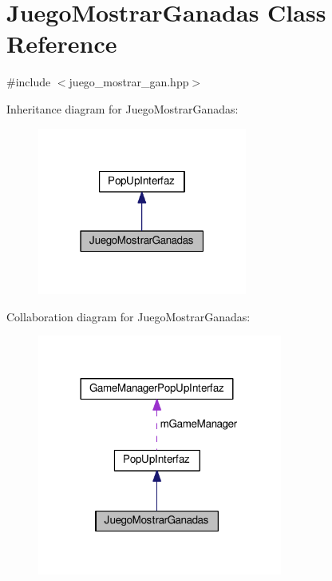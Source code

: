 \hypertarget{class_juego_mostrar_ganadas}{}\section{Juego\+Mostrar\+Ganadas Class Reference}
\label{class_juego_mostrar_ganadas}


{\ttfamily \#include $<$juego\+\_\+mostrar\+\_\+gan.\+hpp$>$}



Inheritance diagram for Juego\+Mostrar\+Ganadas\+:
\nopagebreak
\begin{figure}[H]
\begin{center}
\leavevmode
\includegraphics[width=195pt]{class_juego_mostrar_ganadas__inherit__graph}
\end{center}
\end{figure}


Collaboration diagram for Juego\+Mostrar\+Ganadas\+:
\nopagebreak
\begin{figure}[H]
\begin{center}
\leavevmode
\includegraphics[width=228pt]{class_juego_mostrar_ganadas__coll__graph}
\end{center}
\end{figure}
